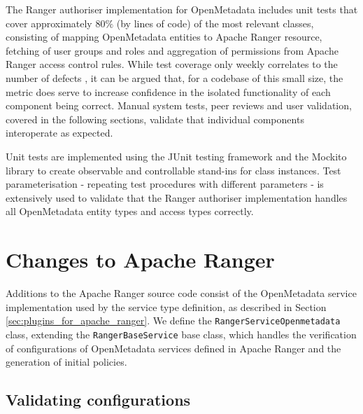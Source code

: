 The Ranger authoriser implementation for OpenMetadata includes unit tests that cover approximately $80\%$ (by lines of code) of the most relevant classes, consisting of mapping OpenMetadata entities to Apache Ranger resource, fetching of user groups and roles and aggregation of permissions from Apache Ranger access control rules. While test coverage only weekly correlates to the number of defects \cite{testCoverageAntinyan2018}, it can be argued that, for a codebase of this small size, the metric does serve to increase confidence in the isolated functionality of each component being correct. Manual system tests, peer reviews and user validation, covered in the following sections, validate that individual components interoperate as expected.

Unit tests are implemented using the JUnit \cite{junitTech} testing framework and the Mockito \cite{mockitoTech} library to create observable and controllable stand-ins for class instances. Test parameterisation - repeating test procedures with different parameters - is extensively used to validate that the Ranger authoriser implementation handles all OpenMetadata entity types and access types correctly.

\section{\label{sec:changes_to_apache_ranger} Changes to Apache Ranger}

Additions to the Apache Ranger source code consist of the OpenMetadata service implementation used by the service type definition, as described in Section \ref{sec:plugins_for_apache_ranger}. We define the \texttt{RangerServiceOpenmetadata} class, extending the \texttt{RangerBaseService} base class, which handles the verification of configurations of OpenMetadata services defined in Apache Ranger and the generation of initial policies.

\subsection{Validating configurations}


